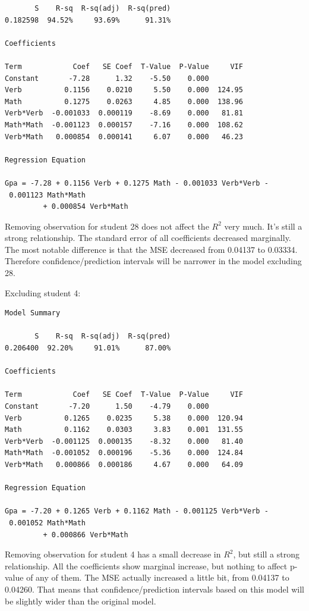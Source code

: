 \documentclass{article}
\begin{document}
\begin{enumerate}
\begin{verbatim}
       S    R-sq  R-sq(adj)  R-sq(pred)
0.182598  94.52%     93.69%      91.31%

Coefficients

Term            Coef   SE Coef  T-Value  P-Value     VIF
Constant       -7.28      1.32    -5.50    0.000
Verb          0.1156    0.0210     5.50    0.000  124.95
Math          0.1275    0.0263     4.85    0.000  138.96
Verb*Verb  -0.001033  0.000119    -8.69    0.000   81.81
Math*Math  -0.001123  0.000157    -7.16    0.000  108.62
Verb*Math   0.000854  0.000141     6.07    0.000   46.23

Regression Equation

Gpa = -7.28 + 0.1156 Verb + 0.1275 Math - 0.001033 Verb*Verb - 0.001123 Math*Math 
         + 0.000854 Verb*Math
\end{verbatim}

Removing observation for student 28 does not affect the \(R^2\) very
much. It's still a strong relationship. The standard error of all
coefficients decreased marginally. The most notable difference is that
the MSE decreased from 0.04137 to 0.03334. Therefore
confidence/prediction intervals will be narrower in the model excluding
28.

\newpage
Excluding student 4:

\begin{verbatim}
Model Summary

       S    R-sq  R-sq(adj)  R-sq(pred)
0.206400  92.20%     91.01%      87.00%

Coefficients

Term            Coef   SE Coef  T-Value  P-Value     VIF
Constant       -7.20      1.50    -4.79    0.000
Verb          0.1265    0.0235     5.38    0.000  120.94
Math          0.1162    0.0303     3.83    0.001  131.55
Verb*Verb  -0.001125  0.000135    -8.32    0.000   81.40
Math*Math  -0.001052  0.000196    -5.36    0.000  124.84
Verb*Math   0.000866  0.000186     4.67    0.000   64.09

Regression Equation

Gpa = -7.20 + 0.1265 Verb + 0.1162 Math - 0.001125 Verb*Verb - 0.001052 Math*Math
         + 0.000866 Verb*Math
\end{verbatim}

Removing observation for student 4 has a small decrease in \(R^2\), but
still a strong relationship. All the coefficients show marginal
increase, but nothing to affect p-value of any of them. The MSE actually
increased a little bit, from 0.04137 to 0.04260. That means that
confidence/prediction intervals based on this model will be slightly
wider than the original model.
\\


\end{enumerate}
\end{document}

